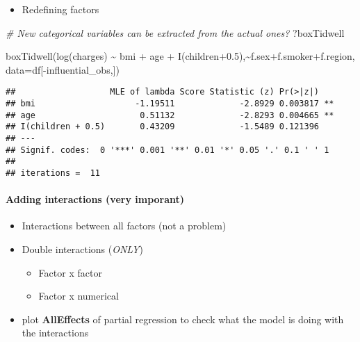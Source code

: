 \documentclass[
]{article}
\newenvironment{Shaded}{\begin{snugshade}}{\end{snugshade}}
\newcommand{\AttributeTok}[1]{\textcolor[rgb]{0.77,0.63,0.00}{#1}}
\newcommand{\CommentTok}[1]{\textcolor[rgb]{0.56,0.35,0.01}{\textit{#1}}}
\newcommand{\FloatTok}[1]{\textcolor[rgb]{0.00,0.00,0.81}{#1}}
\newcommand{\FunctionTok}[1]{\textcolor[rgb]{0.00,0.00,0.00}{#1}}
\newcommand{\NormalTok}[1]{#1}
\newcommand{\SpecialCharTok}[1]{\textcolor[rgb]{0.00,0.00,0.00}{#1}}
\providecommand{\tightlist}{%
  \setlength{\itemsep}{0pt}\setlength{\parskip}{0pt}}
\begin{document}
\begin{itemize}
\tightlist
\item
  Redefining factors
\end{itemize}

\begin{Shaded}
\begin{Highlighting}[]
\CommentTok{\# New categorical variables can be extracted from the actual ones?}
\NormalTok{?boxTidwell}

\FunctionTok{boxTidwell}\NormalTok{(}\FunctionTok{log}\NormalTok{(charges) }\SpecialCharTok{\textasciitilde{}}\NormalTok{ bmi }\SpecialCharTok{+}\NormalTok{ age }\SpecialCharTok{+}  \FunctionTok{I}\NormalTok{(children}\FloatTok{+0.5}\NormalTok{),}\SpecialCharTok{\textasciitilde{}}\NormalTok{f.sex}\SpecialCharTok{+}\NormalTok{f.smoker}\SpecialCharTok{+}\NormalTok{f.region, }\AttributeTok{data=}\NormalTok{df[}\SpecialCharTok{{-}}\NormalTok{influential\_obs,])}
\end{Highlighting}
\end{Shaded}

\begin{verbatim}
##                   MLE of lambda Score Statistic (z) Pr(>|z|)   
## bmi                    -1.19511             -2.8929 0.003817 **
## age                     0.51132             -2.8293 0.004665 **
## I(children + 0.5)       0.43209             -1.5489 0.121396   
## ---
## Signif. codes:  0 '***' 0.001 '**' 0.01 '*' 0.05 '.' 0.1 ' ' 1
## 
## iterations =  11
\end{verbatim}

\hypertarget{adding-interactions-very-imporant}{%
\paragraph{Adding interactions (very
imporant)}\label{adding-interactions-very-imporant}}

\begin{itemize}
\item
  Interactions between all factors (not a problem)
\item
  Double interactions (\emph{ONLY})

  \begin{itemize}
  \item
    Factor x factor
  \item
    Factor x numerical
  \end{itemize}
\item
  plot \textbf{AllEffects} of partial regression to check what the model
  is doing with the interactions
\end{itemize}
\end{document}
